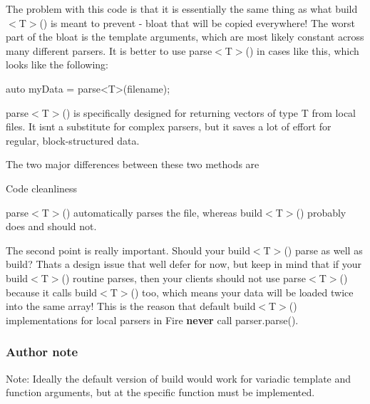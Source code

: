 The problem with this code is that it is essentially the same thing as what build$<$T$>$() is meant to prevent -\/ bloat that will be copied everywhere! The worst part of the bloat is the template arguments, which are most likely constant across many different parsers. It is better to use parse$<$T$>$() in cases like this, which looks like the following\+:


\begin{DoxyCode}
\textcolor{keyword}{auto} myData = parse<T>(filename);
\end{DoxyCode}


parse$<$T$>$() is specifically designed for returning vectors of type T from local files. It isn\textquotesingle{}t a substitute for complex parsers, but it saves a lot of effort for regular, block-\/structured data.

The two major differences between these two methods are


\begin{DoxyItemize}
\item Code cleanliness
\item parse$<$T$>$() automatically parses the file, whereas build$<$T$>$() probably does and should not.
\end{DoxyItemize}

The second point is really important. Should your build$<$T$>$() parse as well as build? That\textquotesingle{}s a design issue that we\textquotesingle{}ll defer for now, but keep in mind that if your build$<$T$>$() routine parses, then your clients should not use parse$<$T$>$() because it calls build$<$T$>$() too, which means your data will be loaded twice into the same array! This is the reason that default build$<$T$>$() implementations for local parsers in Fire {\bfseries never} call parser.\+parse().

\subsubsection*{Author note}

Note\+: Ideally the default version of build would work for variadic template and function arguments, but at the specific function must be implemented. 